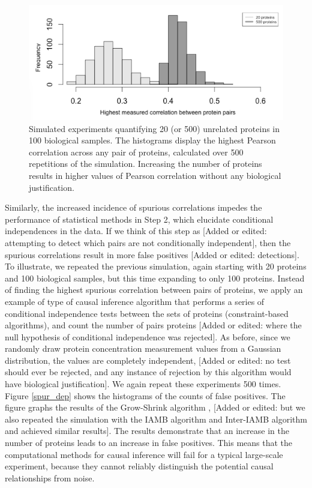 \documentclass[journal=jacsat,manuscript=article]{achemso}
\def\added#1{{\color{magenta}[Added or edited: #1]}}
\begin{document}
\begin{figure}[!tpb]
\centerline{\includegraphics[width=1\textwidth]{figs/spurious_corr.png}}
\caption{Simulated experiments quantifying 20 (or 500) unrelated proteins in 100 biological samples. The histograms display the highest Pearson correlation across any pair of proteins, calculated over 500 repetitions of the simulation. Increasing the number of proteins results in higher values of Pearson correlation without any biological justification.}
\label{spur_corr}
\end{figure}

Similarly, the increased incidence of spurious correlations impedes the performance of statistical methods in Step 2, which elucidate conditional independences in the data.  If we think of this step as \added{attempting to detect which pairs are not conditionally independent}, then the spurious correlations result in more false positives \added{detections}. To illustrate, we repeated the previous simulation, again starting with 20 proteins and 100 biological samples, but this time expanding to only 100 proteins.  Instead of finding the highest spurious correlation between pairs of proteins, we apply an example of type of causal inference algorithm that performs a series of conditional independence tests between the sets of proteins (constraint-based algorithms\cite{spirtes2000causation}), and count the number of pairs proteins \added{where the null hypothesis of conditional independence was rejected}.  As before, since we randomly draw protein concentration measurement values from a Gaussian distribution, the values are completely independent, \added{no test should ever be rejected, and any instance of rejection by this algorithm would have biological justification}.  We again repeat these experiments 500 times. Figure \ref{spur_dep} shows the histograms of the counts of false positives.  The figure graphs the results of the Grow-Shrink algorithm \cite{margaritis2003learning}, \added{but we also repeated the simulation with the IAMB algorithm\cite{tsamardinos2003algorithms} and Inter-IAMB algorithm\cite{yaramakala2005speculative} and achieved similar results}.    The results demonstrate that an increase in the number of proteins leads to an increase in false positives. This means that the computational methods for causal inference will fail for a typical large-scale experiment, because they cannot reliably distinguish the potential causal relationships from noise.
\end{document}
